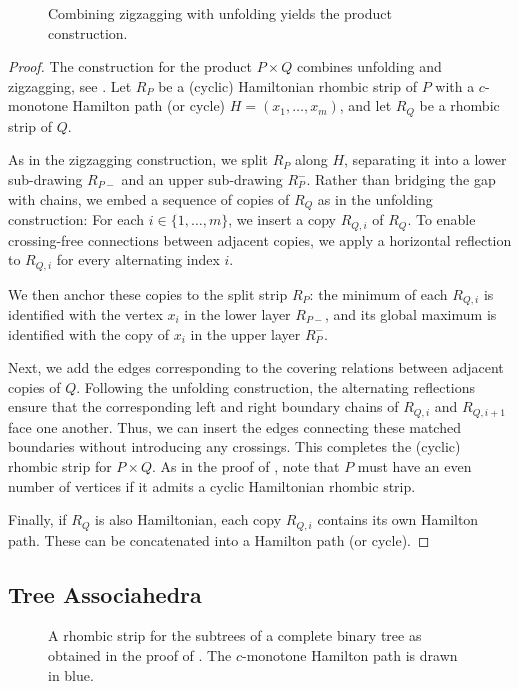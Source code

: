 \documentclass[fontsize=11pt,a4paper,DIV=12]{scrartcl}
\begin{document}
\begin{figure}[!ht]
    \centering
    
    \caption{Combining zigzagging with unfolding yields the product construction.}
    \label{fig:product}
\end{figure}

\products*
\begin{proof}
    The construction for the product $P \times Q$ combines unfolding and zigzagging, see . Let $R_P$ be a (cyclic) Hamiltonian rhombic strip of $P$ with a $c$-monotone Hamilton path (or cycle) $H = (x_1, \ldots, x_m)$, and let $R_Q$ be a rhombic strip of $Q$.

    As in the zigzagging construction, we split $R_P$ along $H$, separating it into a lower sub-drawing $R_{P-}$ and an upper sub-drawing $R_P^-$. Rather than bridging the gap with chains, we embed a sequence of copies of $R_Q$ as in the unfolding construction: For each $i \in \{1, \ldots, m\}$, we insert a copy $R_{Q,i}$ of $R_Q$. To enable crossing-free connections between adjacent copies, we apply a horizontal reflection to $R_{Q,i}$ for every alternating index $i$.

    We then anchor these copies to the split strip $R_P$: the minimum of each $R_{Q,i}$ is identified with the vertex $x_i$ in the lower layer $R_{P-}$, and its global maximum is identified with the copy of $x_i$ in the upper layer $R_P^-$.

    Next, we add the edges corresponding to the covering relations between adjacent copies of $Q$. Following the unfolding construction, the alternating reflections ensure that the corresponding left and right boundary chains of $R_{Q,i}$ and $R_{Q,i+1}$ face one another. Thus, we can insert the edges connecting these matched boundaries without introducing any crossings. This completes the (cyclic) rhombic strip for $P \times Q$. As in the proof of , note that $P$ must have an even number of vertices if it admits a cyclic Hamiltonian rhombic strip.

    Finally, if $R_Q$ is also Hamiltonian, each copy $R_{Q,i}$ contains its own Hamilton path. These can be concatenated into a Hamilton path (or cycle).
\end{proof}

\subsection{Tree Associahedra}

\begin{figure}[!ht]
    \centering
    
    \caption{A rhombic strip for the subtrees of a complete binary tree as obtained in the proof of . The $c$-monotone Hamilton path is drawn in blue.}
    \label{fig:complete binary tree rs}
\end{figure}
\end{document}
